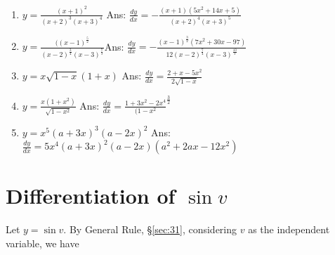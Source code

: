 \begin{enumerate}
\item
$y = \frac{(x + 1)^2}{(x + 2)^3 (x + 3)^4}$
\qquad\qquad\qquad\qquad\qquad\qquad Ans: 
 	$\frac{dy}{dx} = -\frac{(x + 1)(5x^2 + 14x + 5)}{(x + 2)^4 (x + 3)^5}$

\item
$y = \frac{((x - 1)^{\frac{5}{2}}}{(x - 2)^{\frac{3}{4}}(x - 3)^{\frac{7}{3}}}$\qquad\qquad\qquad\qquad\qquad\qquad Ans: 	
$\frac{dy}{dx} 
= -\frac{(x - 1)^{\frac{3}{2}}(7x^2 + 30x - 97)}{12(x - 2)^{\frac{7}{4}}(x - 3)^{\frac{10}{3}}}$

\item
$y = x \sqrt{1 - x} (1 + x)$
\qquad\qquad\qquad\qquad\qquad\qquad Ans: 
 	$\frac{dy}{dx} = \frac{2 + x - 5x^2}{2\sqrt{1 - x}}$

\item
$y = \frac{x(1 + x^2)}{\sqrt{1 - x^2}}$ 
	\qquad\qquad\qquad\qquad\qquad\qquad Ans: 
$\frac{dy}{dx} = \frac{1 + 3x^2 - 2x^4}{(1 - x^2}^{\frac{3}{2}}$

\item
$y = x^5(a + 3x)^3(a - 2x)^2$\qquad\qquad\qquad
{\scriptsize{Ans: 	
$\frac{dy}{dx} = 5x^4(a + 3x)^2(a - 2x)(a^2 + 2ax - 12x^2)$}}

\end{enumerate}


\section{Differentiation of $\sin v$}

Let 	$y 	= \sin v$.
By General Rule, \S \ref{sec:31}, %
considering $v$ as the independent variable, we have

